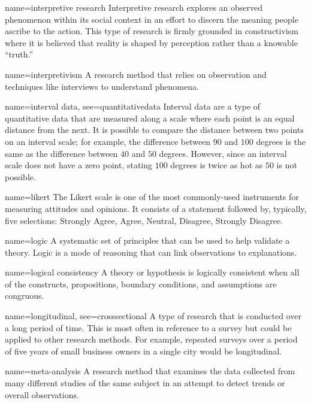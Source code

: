 {name={interpretive research}}
{%
	Interpretive research explores an observed phenomenon within its social context in an effort to discern the meaning people ascribe to the action. This type of research is firmly grounded in constructivism where it is believed that reality is shaped by perception rather than a knowable ``truth.'' 
}

{name={interpretivism}}
{%
	A research method that relies on observation and techniques like interviews to understand phenomena. 
}

{name={interval data},
	see={quantitativedata}}
{%
	Interval data are a type of quantitative data that are measured along a scale where each point is an equal distance from the next. It is possible to compare the distance between two points on an interval scale; for example, the difference between $ 90 $ and $ 100 $ degrees is the same as the difference between $ 40 $ and $ 50 $ degrees. However, since an interval scale does not have a zero point, stating $ 100 $ degrees is twice as hot as $ 50 $ is not possible. 
}


{name={likert}}
{%
	The Likert scale is one of the most commonly-used instruments for measuring attitudes and opinions. It consists of a statement followed by, typically, five selections: Strongly Agree, Agree, Neutral, Disagree, Strongly Disagree.
}

{name={logic}}
{%
	A systematic set of principles that can be used to help validate a theory. Logic is a mode of reasoning that can link observations to explanations.
}

{name={logical consistency}}
{%
	A theory or hypothesis is logically consistent when all of the constructs, propositions, boundary conditions, and assumptions are congruous.
}

{name={longitudinal},
	see={crosssectional}}
{%
	A type of research that is conducted over a long period of time. This is most often in reference to a survey but could be applied to other research methods. For example, repeated surveys over a period of five years of small business owners in a single city would be longitudinal. 
}

{name={meta-analysis}}
{%
	A research method that examines the data collected from many different studies of the same subject in an attempt to detect trends or overall observations.
}

